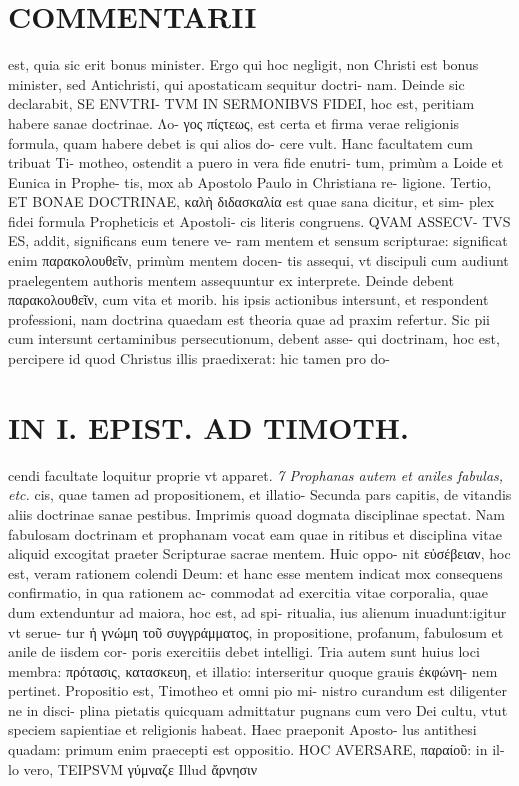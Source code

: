 \documentclass{article}
\begin{document}
\begin{pages}
\section*{COMMENTARII }
\marginpar{[ p.94 ]}\pstart est, quia sic erit bonus minister. Ergo qui hoc negligit, non Christi est bonus minister, sed Antichristi, qui apostaticam sequitur doctri- nam. Deinde sic declarabit, SE ENVTRI- TVM IN SERMONIBVS FIDEI, hoc est, peritiam habere sanae doctrinae. Λo- γος πίςτεως, est certa et firma verae religionis formula, quam habere debet is qui alios do- cere vult. Hanc facultatem cum tribuat Ti- motheo, ostendit a puero in vera fide enutri- tum, primùm a Loide et Eunica in Prophe- tis, mox ab Apostolo Paulo in Christiana re- ligione.  \pend\pstart Tertio, ET BONAE DOCTRINAE, καλὴ διδασκαλία est quae sana dicitur, et sim- plex fidei formula Propheticis et Apostoli- cis literis congruens. QVAM ASSECV- TVS ES, addit, significans eum tenere ve- ram mentem et sensum scripturae: significat enim παρακολουθεῖν, primùm mentem docen- tis assequi, vt discipuli cum audiunt praelegentem authoris mentem assequuntur ex interprete. Deinde debent παρακολουθεῖν, cum vita et morib. his ipsis actionibus intersunt, et respondent professioni, nam doctrina quaedam est theoria quae ad praxim refertur. Sic pii cum intersunt certaminibus persecutionum, debent asse- qui doctrinam, hoc est, percipere id quod Christus illis praedixerat: hic tamen pro do-  \pend
\section*{IN I. EPIST. AD TIMOTH. }
\marginpar{[ p.95 ]}\pstart cendi facultate loquitur proprie vt apparet.  \pend
\textit{7 Prophanas autem et aniles fabulas, etc. }\pstart cis, quae tamen ad propositionem, et illatio- Secunda pars capitis, de vitandis aliis doctrinae sanae pestibus. Imprimis quoad dogmata disciplinae spectat. Nam fabulosam doctrinam et prophanam vocat eam quae in ritibus et disciplina vitae aliquid excogitat praeter Scripturae sacrae mentem. Huic oppo- nit εὐσέβειαν, hoc est, veram rationem colendi Deum: et hanc esse mentem indicat mox consequens confirmatio, in qua rationem ac- commodat ad exercitia vitae corporalia, quae dum extenduntur ad maiora, hoc est, ad spi- ritualia, ius alienum inuadunt:igitur vt serue- tur ἡ γνώμη τοῦ συγγράμματος, in propositione, profanum, fabulosum et anile de iisdem cor- poris exercitiis debet intelligi. Tria autem sunt huius loci membra: πρότασις, κατασκευη, et illatio: interseritur quoque grauis ἐκφώνη- nem pertinet.  \pend\pstart Propositio est, Timotheo et omni pio mi- nistro curandum est diligenter ne in disci- plina pietatis quicquam admittatur pugnans cum vero Dei cultu, vtut speciem sapientiae et religionis habeat. Haec praeponit Aposto- lus antithesi quadam: primum enim praecepti est oppositio. HOC AVERSARE, παραίοῦ: in il- lo vero, TEIPSVM γύμναζε Illud ἄρνησιν  \pend

\end{pages}
\end{document}
